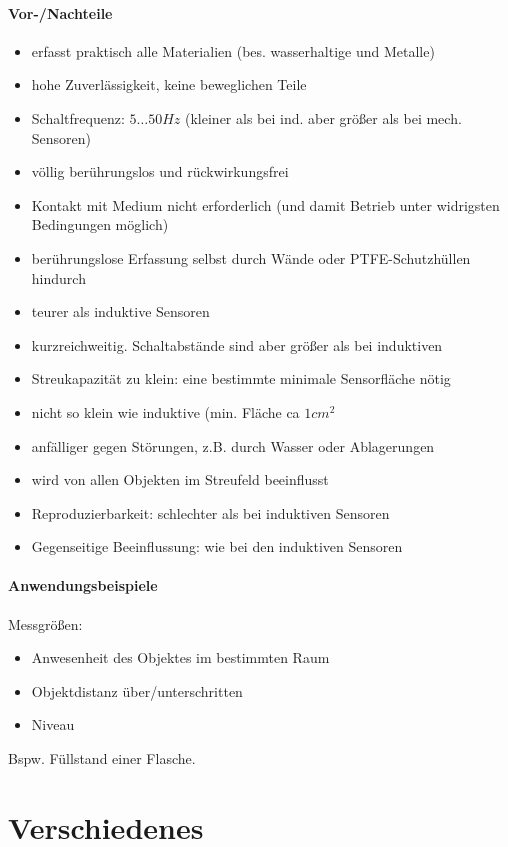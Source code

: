 \subsubsection{Vor-/Nachteile}
\begin{itemize}[label=$+$]
\item erfasst praktisch alle Materialien (bes. wasserhaltige und Metalle)
\item hohe Zuverlässigkeit, keine beweglichen Teile
\item Schaltfrequenz: $5\ldots 50 \unit{Hz}$ (kleiner als bei ind. aber größer als bei mech. Sensoren)
\item völlig berührungslos  und rückwirkungsfrei
\item Kontakt mit Medium nicht erforderlich (und damit Betrieb unter widrigsten Bedingungen möglich)
\item berührungslose Erfassung selbst durch Wände oder PTFE-Schutzhüllen hindurch
\end{itemize}
\begin{itemize}[label=$-$]
\item teurer als induktive Sensoren
\item kurzreichweitig. Schaltabstände sind aber größer als bei induktiven
\item Streukapazität zu klein: eine bestimmte minimale Sensorfläche nötig
\item nicht so klein wie induktive (min. Fläche ca $1\unit{cm^2}$
\item anfälliger gegen Störungen, z.B. durch Wasser oder Ablagerungen
\item wird von allen Objekten im Streufeld beeinflusst
\item Reproduzierbarkeit: schlechter als bei induktiven Sensoren
\item Gegenseitige Beeinflussung: wie bei den induktiven Sensoren
\end{itemize}
\subsubsection{Anwendungsbeispiele}
Messgrößen:
\begin{itemize}
\item Anwesenheit des Objektes im bestimmten Raum
\item Objektdistanz über/unterschritten
\item Niveau
\end{itemize}
Bspw. Füllstand einer Flasche.

\chapter{Verschiedenes}

